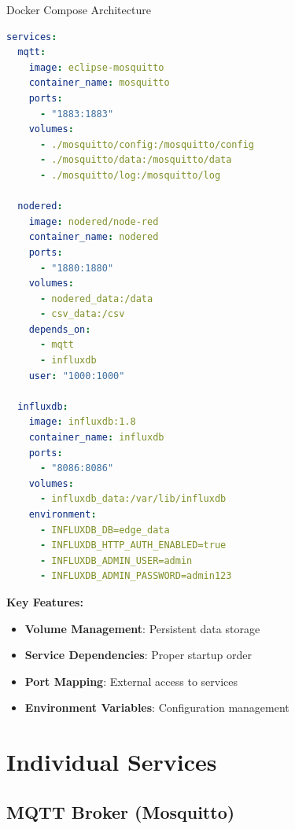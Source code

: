\documentclass[aspectratio=169]{beamer}
\begin{document}
\begin{frame}{Docker Compose Architecture}
\begin{center}
\begin{lstlisting}[language=yaml]
services:
  mqtt:
    image: eclipse-mosquitto
    container_name: mosquitto
    ports:
      - "1883:1883"
    volumes:
      - ./mosquitto/config:/mosquitto/config
      - ./mosquitto/data:/mosquitto/data
      - ./mosquitto/log:/mosquitto/log

  nodered:
    image: nodered/node-red
    container_name: nodered
    ports:
      - "1880:1880"
    volumes:
      - nodered_data:/data
      - csv_data:/csv
    depends_on:
      - mqtt
      - influxdb
    user: "1000:1000"

  influxdb:
    image: influxdb:1.8
    container_name: influxdb
    ports:
      - "8086:8086"
    volumes:
      - influxdb_data:/var/lib/influxdb
    environment:
      - INFLUXDB_DB=edge_data
      - INFLUXDB_HTTP_AUTH_ENABLED=true
      - INFLUXDB_ADMIN_USER=admin
      - INFLUXDB_ADMIN_PASSWORD=admin123
\end{lstlisting}
\end{center}

\textbf{Key Features:}
\begin{itemize}
    \item \textbf{Volume Management}: Persistent data storage
    \item \textbf{Service Dependencies}: Proper startup order
    \item \textbf{Port Mapping}: External access to services
    \item \textbf{Environment Variables}: Configuration management
\end{itemize}
\end{frame}

\section{Individual Services}

\subsection{MQTT Broker (Mosquitto)}
\end{document}
